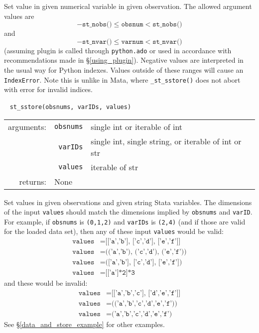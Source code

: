 \documentclass{article}
\begin{document}
			\vspace{1.5mm}
			\noindent Set value in given numerical variable in given observation. The allowed argument values are 
			\[
				-\texttt{st\_nobs()} \leq \texttt{obsnum} < \texttt{st\_nobs()}
			\]
			and
			\[
				-\texttt{st\_nvar()} \leq \texttt{varnum} < \texttt{st\_nvar()}
			\]
			(assuming plugin is called through \lstinline$python.ado$ or used in accordance with recommendations made in \S\ref{using_plugin}). Negative values are interpreted in the usual way for Python indexes. Values outside of these ranges will cause an \lstinline$IndexError$. Note this is unlike in Mata, where \lstinline{_st_sstore()} does not abort with error for invalid indices. \newline
			
			
			\ \newline
			\noindent \lstinline$st_sstore(obsnums, varIDs, values)$
								
			\vspace{1.5mm}
			\noindent 
			\indent \begin{tabular}{rrl}
					arguments: & \texttt{obsnums} & single int or iterable of int \\
						& \texttt{varIDs} & single int, single string, or iterable of int or str \\
						& \texttt{values} & iterable of str \\
					returns: & \multicolumn{2}{l}{None}
				\end{tabular}
								
			\vspace{1.5mm}
			\noindent Set values in given observations and given string Stata variables. The dimensions of the input \lstinline{values} should match the dimensions implied by \lstinline{obsnums} and \lstinline{varID}. For example, if \lstinline{obsnums} is \lstinline{(0,1,2)} and \lstinline{varIDs} is \lstinline{(2,4)} (and if those are valid for the loaded data set), then any of these input \lstinline{values} would be valid:
			\begin{align*}
				\texttt{values} &= \texttt{[['a','b'], ['c','d'], ['e','f']]} \\
				\texttt{values} &= \texttt{(('a','b'), ('c','d'), ('e','f'))} \\
				\texttt{values} &= \texttt{(['a','b'], ['c','d'], ['e','f'])} \\
				\texttt{values} &= \texttt{[['a']*2]*3}
			\end{align*}
			and these would be invalid:
			\begin{align*}
				\texttt{values} &= \texttt{[['a','b','c'], ['d','e','f']]} \\
				\texttt{values} &= \texttt{(('a','b','c','d','e','f'))} \\
				\texttt{values} &= \texttt{('a','b','c','d','e','f')}
			\end{align*}
See \S\ref{data_and_store_example} for other examples. 
			
\end{document}
